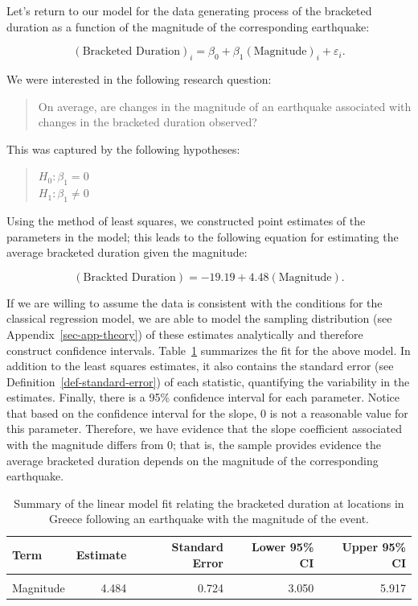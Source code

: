 \documentclass[
  letterpaper,
  DIV=11,
  numbers=noendperiod]{scrreprt}
\theoremstyle{plain}
\theoremstyle{definition}
\theoremstyle{definition}
\theoremstyle{remark}
\begin{document}
Let's return to our model for the data generating process of the
bracketed duration as a function of the magnitude of the corresponding
earthquake:

\[(\text{Bracketed Duration})_i = \beta_0 + \beta_1(\text{Magnitude})_i + \varepsilon_i.\]

We were interested in the following research question:

\begin{quote}
On average, are changes in the magnitude of an earthquake associated
with changes in the bracketed duration observed?
\end{quote}

This was captured by the following hypotheses:

\begin{quote}
\(H_0: \beta_1 = 0\)\\
\(H_1: \beta_1 \neq 0\)
\end{quote}

Using the method of least squares, we constructed point estimates of the
parameters in the model; this leads to the following equation for
estimating the average bracketed duration given the magnitude:

\[(\text{Brackted Duration}) = -19.19 + 4.48(\text{Magnitude}).\]

If we are willing to assume the data is consistent with the conditions
for the classical regression model, we are able to model the sampling
distribution (see Appendix~\ref{sec-app-theory}) of these estimates
analytically and therefore construct confidence intervals.
Table~\ref{tbl-regconditions-slr-summary} summarizes the fit for the
above model. In addition to the least squares estimates, it also
contains the standard error (see Definition~\ref{def-standard-error}) of
each statistic, quantifying the variability in the estimates. Finally,
there is a 95\% confidence interval for each parameter. Notice that
based on the confidence interval for the slope, 0 is not a reasonable
value for this parameter. Therefore, we have evidence that the slope
coefficient associated with the magnitude differs from 0; that is, the
sample provides evidence the average bracketed duration depends on the
magnitude of the corresponding earthquake.

\hypertarget{tbl-regconditions-slr-summary}{}
\begin{table}
\caption{\label{tbl-regconditions-slr-summary}Summary of the linear model fit relating the bracketed duration at
locations in Greece following an earthquake with the magnitude of the
event. }\tabularnewline

\centering
\begin{tabular}[t]{lrrrr}
\toprule
Term & Estimate & Standard Error & Lower 95\% CI & Upper 95\% CI\\
\midrule
\cellcolor{gray!6}{(Intercept)} & \cellcolor{gray!6}{-19.194} & \cellcolor{gray!6}{3.975} & \cellcolor{gray!6}{-27.066} & \cellcolor{gray!6}{-11.323}\\
Magnitude & 4.484 & 0.724 & 3.050 & 5.917\\
\bottomrule
\end{tabular}
\end{table}
\end{document}
